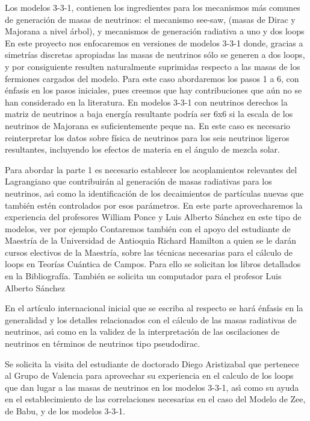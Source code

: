 Los modelos 3-3-1, contienen los ingredientes para los mecanismos más
comunes de generación de masas de neutrinos: el mecanismo see-saw,
(masas de Dirac y Majorana a nivel árbol), y mecanismos de generación
radiativa a uno y dos loops %
En este proyecto nos
enfocaremos en versiones de modelos 3-3-1 donde, gracias a simetrías
discretas apropiadas %
las masas de neutrinos
sólo se generen a dos loops, y por consiguiente resulten naturalmente
suprimidas respecto a las masas de los fermiones cargados del modelo.
Para este caso abordaremos los pasos 1 a 6, con énfasis en los pasos
iniciales, pues creemos que hay contribuciones que aún no se han
considerado en la literatura. En modelos 3-3-1 con neutrinos derechos
la matriz de neutrinos a baja energía resultante podría ser 6x6 si la
escala de los neutrinos de Majorana es suficientemente peque na. En
este caso es necesario reinterpretar los datos sobre física de
neutrinos para los seis neutrinos ligeros resultantes, incluyendo los
efectos de materia en el ángulo de mezcla solar. 

Para abordar la parte 1 es necesario establecer los acoplamientos
relevantes del Lagrangiano que contribuirán al generación de masas
radiativas para los neutrinos, as\'\i{} como la identificación de los
decaimientos de partículas nuevas que también estén controlados
por esos parámetros. En este parte aprovecharemos la experiencia del
profesores William Ponce y Luis Alberto Sánchez en este tipo de
modelos, ver por ejemplo %
Contaremos también con
el apoyo del estudiante de Maestría de la Universidad de
Antioquia Richard Hamilton a quien se le darán cursos electivos de la
Maestría, sobre las técnicas necesarias para el cálculo de loops
en Teorías Cuántica de Campos.  Para ello se solicitan los libros
detallados en la Bibliografía.  También se solicita un computador
para el profesor Luis Alberto Sánchez


En el artículo internacional inicial que se escriba al respecto se
hará énfasis en la generalidad y los detalles relacionados con el
cálculo de las masas radiativas de neutrinos, as\'\i{} como en la validez
de la interpretación de las oscilaciones de neutrinos en términos de
neutrinos tipo pseudodirac.


Se solicita la visita del estudiante de doctorado Diego Aristizabal
que pertenece al Grupo de Valencia para aprovechar su experiencia en
el calculo de los loops que dan lugar a las masas de neutrinos en los
modelos 3-3-1, as\'\i{} como su ayuda en el establecimiento de las
correlaciones necesarias en el caso del Modelo de Zee, de Babu, y de
los modelos 3-3-1.



